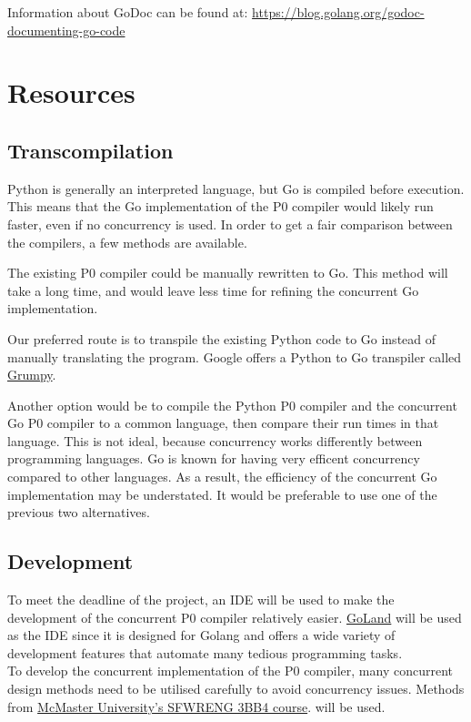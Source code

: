 \documentclass{article}
\begin{document}
Information about GoDoc can be found at: \url{https://blog.golang.org/godoc-documenting-go-code}

\section{Resources}

\subsection{Transcompilation} %

Python is generally an interpreted language, but Go is compiled before execution.
This means that the Go implementation of the P0 compiler would likely run
faster, even if no concurrency is used.
In order to get a fair comparison between the compilers, a few methods are
available.

The existing P0 compiler could be manually rewritten to Go.
This method will take a long time, and would leave less time for refining the
concurrent Go implementation.

Our preferred route is to transpile the existing Python code to Go instead of
manually translating the program.
Google offers a Python to Go transpiler called
\href{https://github.com/google/grumpy}{Grumpy}.

Another option would be to compile the Python P0 compiler and the concurrent Go
P0 compiler to a common language, then compare their run times in that 
language.
This is not ideal, because concurrency works differently between programming
languages.
Go is known for having very efficent concurrency compared to other languages.
As a result, the efficiency of the concurrent Go implementation may be
understated.
It would be preferable to use one of the previous two alternatives.

\subsection{Development} %
To meet the deadline of the project, an IDE will be used to make the development of the concurrent
P0 compiler relatively easier. \href{https://www.jetbrains.com/go/}{GoLand} will be used as the IDE
since it is designed for Golang and offers a wide variety of development features that automate
many tedious programming tasks.\\
To develop the concurrent implementation of the P0 compiler, many concurrent design methods
need to be utilised carefully to avoid concurrency issues. Methods from \href{https://www.cas.mcmaster.ca/~se3bb4/}{McMaster University's SFWRENG 3BB4 course}. will
be used.\\
\end{document}
